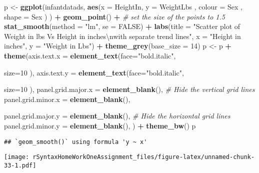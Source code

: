 \documentclass[
]{article}
\newenvironment{Shaded}{\begin{snugshade}}{\end{snugshade}}
\newcommand{\CharTok}[1]{\textcolor[rgb]{0.31,0.60,0.02}{#1}}
\newcommand{\CommentTok}[1]{\textcolor[rgb]{0.56,0.35,0.01}{\textit{#1}}}
\newcommand{\DataTypeTok}[1]{\textcolor[rgb]{0.13,0.29,0.53}{#1}}
\newcommand{\DecValTok}[1]{\textcolor[rgb]{0.00,0.00,0.81}{#1}}
\newcommand{\KeywordTok}[1]{\textcolor[rgb]{0.13,0.29,0.53}{\textbf{#1}}}
\newcommand{\NormalTok}[1]{#1}
\newcommand{\OperatorTok}[1]{\textcolor[rgb]{0.81,0.36,0.00}{\textbf{#1}}}
\newcommand{\OtherTok}[1]{\textcolor[rgb]{0.56,0.35,0.01}{#1}}
\newcommand{\StringTok}[1]{\textcolor[rgb]{0.31,0.60,0.02}{#1}}
\begin{document}
\begin{Shaded}
\begin{Highlighting}[]
\NormalTok{p <-}\StringTok{ }\KeywordTok{ggplot}\NormalTok{(infantdatads, }
       \KeywordTok{aes}\NormalTok{(}\DataTypeTok{x =}\NormalTok{ HeightIn, }
           \DataTypeTok{y =}\NormalTok{ WeightLbs}
\NormalTok{           , }\DataTypeTok{colour =}\NormalTok{ Sex}
\NormalTok{           , }\DataTypeTok{shape =}\NormalTok{ Sex}
\NormalTok{           )}
\NormalTok{       ) }\OperatorTok{+}\StringTok{ }
\StringTok{  }\KeywordTok{geom_point}\NormalTok{() }\OperatorTok{+}\StringTok{ }\CommentTok{# set the size of the points to 1.5}
\StringTok{  }\KeywordTok{stat_smooth}\NormalTok{(}\DataTypeTok{method =} \StringTok{"lm"}\NormalTok{, }\DataTypeTok{se =} \OtherTok{FALSE}\NormalTok{) }\OperatorTok{+}
\StringTok{  }\KeywordTok{labs}\NormalTok{(}\DataTypeTok{title =} \StringTok{"Scatter plot of Weight in lbs Vs Height in inches}\CharTok{\textbackslash{}n}\StringTok{with separate trend lines"}\NormalTok{, }\DataTypeTok{x =} \StringTok{"Height in inches"}\NormalTok{, }\DataTypeTok{y =} \StringTok{"Weight in Lbs"}\NormalTok{) }\OperatorTok{+}\StringTok{ }
\StringTok{  }\KeywordTok{theme_grey}\NormalTok{(}\DataTypeTok{base_size =} \DecValTok{14}\NormalTok{) }
\NormalTok{p <-}\StringTok{ }\NormalTok{p }\OperatorTok{+}\StringTok{ }\KeywordTok{theme}\NormalTok{(}\DataTypeTok{axis.text.x =} \KeywordTok{element_text}\NormalTok{(}\DataTypeTok{face=}\StringTok{"bold.italic"}\NormalTok{, }
                                   
                                   \DataTypeTok{size=}\DecValTok{10}
\NormalTok{                                   ), }
        \DataTypeTok{axis.text.y =} \KeywordTok{element_text}\NormalTok{(}\DataTypeTok{face=}\StringTok{"bold.italic"}\NormalTok{, }
                                   
                                   \DataTypeTok{size=}\DecValTok{10}
\NormalTok{                                   ),}
        \DataTypeTok{panel.grid.major.x =} \KeywordTok{element_blank}\NormalTok{(), }\CommentTok{# Hide the vertical grid lines}
        \DataTypeTok{panel.grid.minor.x =} \KeywordTok{element_blank}\NormalTok{(),}

        \DataTypeTok{panel.grid.major.y =} \KeywordTok{element_blank}\NormalTok{(), }\CommentTok{# Hide the horizontal grid lines}
        \DataTypeTok{panel.grid.minor.y =} \KeywordTok{element_blank}\NormalTok{(),}
\NormalTok{        )  }\OperatorTok{+}\StringTok{ }\KeywordTok{theme_bw}\NormalTok{()}
\NormalTok{p}
\end{Highlighting}
\end{Shaded}

\begin{verbatim}
## `geom_smooth()` using formula 'y ~ x'
\end{verbatim}

\texttt{[image: rSyntaxHomeWorkOneAssignment\_files/figure-latex/unnamed-chunk-33-1.pdf]}
\end{document}
